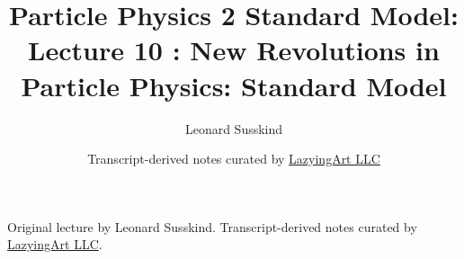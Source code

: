 \documentclass[11pt,oneside]{book}
\begin{document}
\frontmatter
\title{Particle Physics 2 Standard Model: Lecture 10 : New Revolutions in Particle Physics: Standard Model}
\author{Leonard Susskind}
\date{Transcript-derived notes curated by \href{https://lazying.art}{LazyingArt LLC}}
\maketitle
\begin{center}
\small Original lecture by Leonard Susskind. Transcript-derived notes curated by \href{https://lazying.art}{LazyingArt LLC}.
\end{center}
\clearpage
\mainmatter

\end{document}

